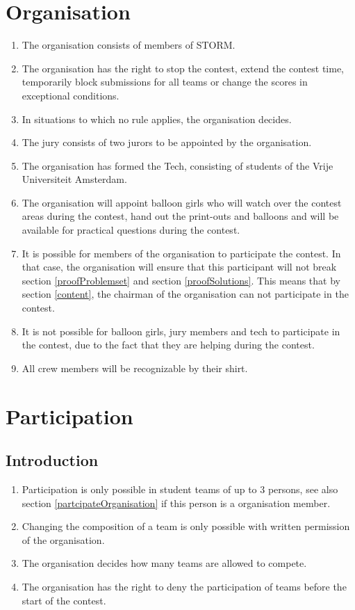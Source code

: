 \documentclass[11pt]{report}
\begin{document}
\chapter{Organisation}
\begin{enumerate}[label=\bfseries 2.\arabic*]
\item The organisation consists of members of STORM.
\item The organisation has the right to stop the contest, extend the contest time, temporarily block submissions for all teams or change the scores in exceptional conditions.
\item \label{noRules} In situations to which no rule applies, the organisation decides.
\item The jury consists of two jurors to be appointed by the organisation.
\item The organisation has formed the Tech, consisting of students of the Vrije Universiteit Amsterdam.
\item The organisation will appoint balloon girls who will watch over the contest areas during the contest, hand out the print-outs and balloons and will be available for practical questions during the contest.
\item \label{partcipateOrganisation} It is possible for members of the organisation to participate the contest. In that case, the organisation will ensure that this participant will not break section \ref{proofProblemset} and section \ref{proofSolutions}. This means that by section \ref{content}, the chairman of the organisation can not participate in the contest.
\item It is not possible for balloon girls, jury members and tech to participate in the contest, due to the fact that they are helping during the contest.
\item All crew members will be recognizable by their shirt.
\end{enumerate}

\chapter{Participation}
\section{Introduction}
\begin{enumerate}[label=\bfseries 3.1\arabic*]
\item Participation is only possible in student teams of up to $3$ persons, see also section \ref{partcipateOrganisation} if this person is a organisation member.
\item Changing the composition of a team is only possible with written permission of the organisation.
\item The organisation decides how many teams are allowed to compete.
\item The organisation has the right to deny the participation of teams before the start of the contest.
\end{enumerate}
\end{document}
